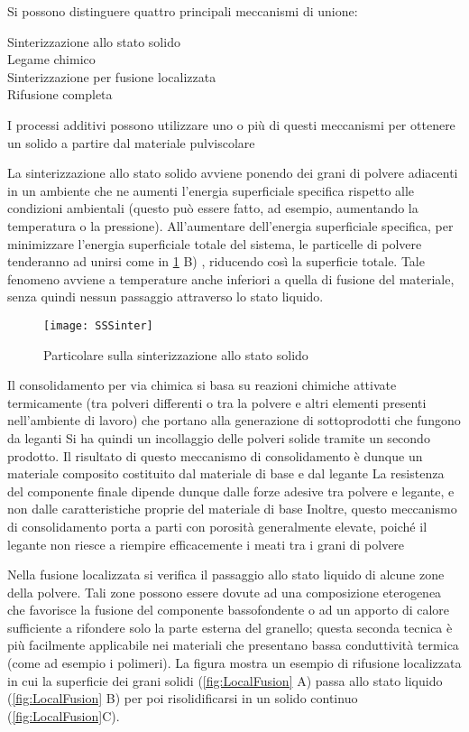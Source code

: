 Si possono distinguere quattro principali meccanismi di unione:
\begin{description}
\item[Sinterizzazione allo stato solido]
\item[Legame chimico]
\item[Sinterizzazione per fusione localizzata]
\item[Rifusione completa]
\end{description}
I processi additivi possono utilizzare uno o più di questi meccanismi per ottenere un solido
a partire dal materiale pulviscolare

La sinterizzazione allo stato solido avviene ponendo dei grani di polvere adiacenti in un
ambiente che ne aumenti l'energia superficiale specifica rispetto alle condizioni ambientali
(questo può essere fatto, ad esempio, aumentando la temperatura o la pressione).
All'aumentare dell'energia superficiale specifica, per minimizzare l'energia superficiale totale
del sistema, le particelle di polvere tenderanno ad unirsi come in \ref{fig:SSSinter} B) , riducendo così la superficie totale. Tale fenomeno avviene a temperature anche inferiori a quella di fusione del materiale, senza quindi nessun passaggio attraverso lo stato liquido.
\begin{figure}
\centering
\texttt{[image: SSSinter]}
\caption{Particolare sulla sinterizzazione allo stato solido}
\label{fig:SSSinter}
\end{figure}

Il consolidamento per via chimica si basa su reazioni chimiche attivate termicamente (tra
polveri differenti o tra la polvere e altri elementi presenti nell'ambiente di lavoro) che portano
alla generazione di sottoprodotti che fungono da leganti
Si ha quindi un incollaggio delle polveri solide tramite un secondo prodotto. Il risultato di
questo meccanismo di consolidamento è dunque un materiale composito costituito dal
materiale di base e dal legante
La resistenza del componente finale dipende dunque dalle forze adesive tra polvere e
legante, e non dalle caratteristiche proprie del materiale di base
Inoltre, questo meccanismo di consolidamento porta a parti con porosità generalmente
elevate, poiché il legante non riesce a riempire efficacemente i meati tra i grani di polvere

Nella fusione localizzata si verifica il passaggio allo stato liquido di alcune zone della polvere.
Tali zone possono essere dovute ad una composizione eterogenea che favorisce la fusione
del componente bassofondente o ad un apporto di calore sufficiente a rifondere solo la parte
esterna del granello; questa seconda tecnica è più facilmente applicabile nei materiali che
presentano bassa conduttività termica (come ad esempio i polimeri).
La figura mostra un esempio di rifusione localizzata in cui la superficie dei grani solidi (\ref{fig:LocalFusion} A) passa allo stato liquido (\ref{fig:LocalFusion} B) per poi risolidificarsi in un solido continuo (\ref{fig:LocalFusion}C).


